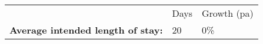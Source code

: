 \begin{tabular}[t]{p{4.45cm}>{\hfill}p{1.3cm}>{\hfill}p{1.7cm}}
   & Days & Growth (pa) \\ 
 \textbf{Average intended length of stay:} & 20 & 0\% \\ 
  \end{tabular}
